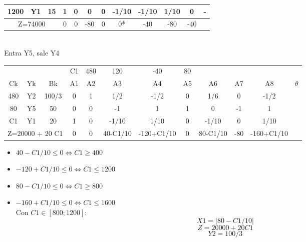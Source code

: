 \documentclass{article}
\begin{document}
\begin{enumerate}
\begin{tabular}{|c  c  c | c  c  c  c  c  c  c  c | c |}
			 1200 & Y1 & 15 & 1 & 0 & 0 & 0 & -1/10 & -1/10 & 1/10 & 0 & -\\ \hline
			 \multicolumn{3}{|c|}{Z=74000} & 0 & 0 & -80 & 0 & 0* & -40 & -80 & -40 &\\ \hline
		\end{tabular}
		\medskip\\
		Entra Y5, sale Y4\\
		\begin{tabular}{|c  c  c | c  c  c  c  c  c  c  c | c |}
			\hline
			 \multicolumn{3}{|c|}{} & C1 & 480 & 120 & -40 & 80 & & & &\\ 
			 Ck & Yk & Bk & A1 & A2 & A3 & A4 & A5 & A6 & A7 & A8 & $\theta$\\ \hline 
			 480 & Y2 & 100/3 & 0 & 1 & 1/2 & -1/2 & 0 & 1/6 & 0 & -1/2 & \\
			 80 & Y5 & 50 & 0 & 0 & -1 & 1 & 1 & 0 & -1 & 1 & \\
			 C1 & Y1 & 20 & 1 & 0 & -1/10 & 1/10 & 0 & -1/10 & 0 & 1/10 & \\ \hline
			 \multicolumn{3}{|c|}{Z=20000 + 20 C1} & 0 & 0 & 40-C1/10 & -120+C1/10 & 0 & 80-C1/10 & -80 & -160+C1/10 &\\ \hline
		\end{tabular}
		\begin{itemize}
				\item $40 - C1/10 \leq 0 \iff C1 \geq 400$
				\item $-120 + C1/10 \leq 0 \iff C1 \leq 1200$
				\item $80 - C1/10 \leq 0 \iff C1 \geq 800$
				\item $-160 + C1/10 \leq 0 \iff C1 \leq 1600$
					\smallskip\\
					Con $C1 \in [800; 1200]$:\\
					$$X1 = |80 - C1/10|$$
					$$Z = 20000 + 20 C1$$
					$$Y2 = 100/3$$
		\end{itemize}
		
     	\smallskip

\end{enumerate}
\end{document}
